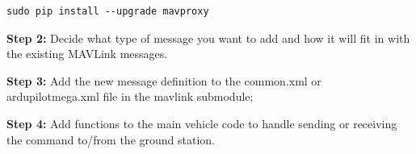 \begin{verbatim}
sudo pip install --upgrade mavproxy
\end{verbatim}

\textbf{Step 2:} Decide what type of message you want to add and how it will fit in with the existing MAVLink messages.

\textbf{Step 3:} Add the new message definition to the common.xml or ardupilotmega.xml file in the mavlink submodule;


\textbf{Step 4:} Add functions to the main vehicle code to handle sending or receiving the command to/from the ground station. 







